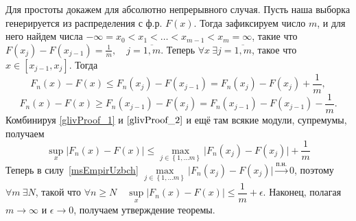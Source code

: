 \documentclass[../TV&MS.tex]{subfiles}
\begin{document}
\begin{Proof}
    Для простоты докажем для абсолютно непрерывного случая.
    Пусть наша выборка генерируется из распределения с ф.р. $F(x)$.
    Тогда зафиксируем число $m$, и для него найдем числа
    $-\infty = x_0 < x_1 <\ldots< x_{m-1} < x_m = \infty$,
    такие что $F(x_j) - F(x_{j-1}) = \frac{1}{m}, \quad j = \overline{1,m}$.
    Теперь $\forall x\ \exists j=\overline{1,m}$, такое что $x \in \left[ x_{j-1}, x_j \right]$. Тогда
    \begin{equation}\label{glivProof_1}
        F_n(x)-F(x) \leqslant F_n(x_j)-F(x_{j-1})=F_n(x_j)-F(x_j)+\frac{1}{m},
    \end{equation}
    \begin{equation}\label{glivProof_2}
        F_n(x)-F(x) \geqslant F_n(x_{j-1})-F(x_{j})=F_n(x_{j-1})-F(x_{j-1})-\frac{1}{m}.
    \end{equation}
    Комбинируя \eqref{glivProof_1} и $\eqref{glivProof_2}$ и ещё там всякие модули, супремумы, получаем
    \begin{equation}
        \sup_x \bigl| F_n(x) - F(x) \bigr| \leqslant
        \max_{j \in \left\{ 1,\ldots m \right\}} 
        \bigl|F_n(x_j) - F(x_j) \bigr| + \frac{1}{m}
    \end{equation} 
    Теперь в силу~\eqref{msEmpirUzbch} 
    $\max\limits_{j \in \left\{ 1,\ldots m \right\}} \bigl|F_n(x_j) - F(x_j) \bigr|
    \xrightarrow{\text{п.н.}} 0$, поэтому $\forall m\ \exists N$,
    такой что $\forall n \geqslant N \quad \sup\limits_x \bigl| F_n(x) - F(x) \bigr| \leqslant \dfrac{1}{m} + \epsilon$.
    Наконец, полагая $m \rightarrow \infty$ и $\epsilon \rightarrow 0$,
    получаем утверждение теоремы.
\end{Proof} 
\end{document}
